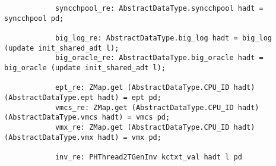 \begin{lstlisting}
            syncchpool_re: AbstractDataType.syncchpool hadt = syncchpool pd;

            big_log_re: AbstractDataType.big_log hadt = big_log (update init_shared_adt l);
            big_oracle_re: AbstractDataType.big_oracle hadt = big_oracle (update init_shared_adt l);
            
            ept_re: ZMap.get (AbstractDataType.CPU_ID hadt) (AbstractDataType.ept hadt) = ept pd;
            vmcs_re: ZMap.get (AbstractDataType.CPU_ID hadt) (AbstractDataType.vmcs hadt) = vmcs pd;
            vmx_re: ZMap.get (AbstractDataType.CPU_ID hadt) (AbstractDataType.vmx hadt) = vmx pd;
            
            inv_re: PHThread2TGenInv kctxt_val hadt l pd

\end{lstlisting}


